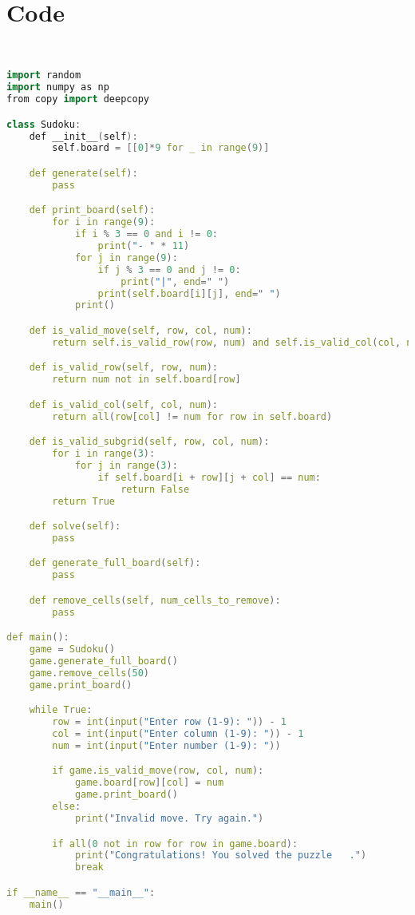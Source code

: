 \documentclass{article}
\begin{document}
\section{Code}
\begin{lstlisting}[language=C++, caption=GAE C++ Code, label=lst:code]


import random
import numpy as np
from copy import deepcopy

class Sudoku:
    def __init__(self):
        self.board = [[0]*9 for _ in range(9)]

    def generate(self):
        pass 

    def print_board(self):
        for i in range(9):
            if i % 3 == 0 and i != 0:
                print("- " * 11)
            for j in range(9):
                if j % 3 == 0 and j != 0:
                    print("|", end=" ")
                print(self.board[i][j], end=" ")
            print()

    def is_valid_move(self, row, col, num):
        return self.is_valid_row(row, num) and self.is_valid_col(col, num) and self.is_valid_subgrid(row - row % 3, col - col % 3, num)

    def is_valid_row(self, row, num):
        return num not in self.board[row]

    def is_valid_col(self, col, num):
        return all(row[col] != num for row in self.board)

    def is_valid_subgrid(self, row, col, num):
        for i in range(3):
            for j in range(3):
                if self.board[i + row][j + col] == num:
                    return False
        return True

    def solve(self):
        pass  

    def generate_full_board(self):
        pass  

    def remove_cells(self, num_cells_to_remove):
        pass  

def main():
    game = Sudoku()
    game.generate_full_board()
    game.remove_cells(50) 
    game.print_board()

    while True:
        row = int(input("Enter row (1-9): ")) - 1
        col = int(input("Enter column (1-9): ")) - 1
        num = int(input("Enter number (1-9): "))

        if game.is_valid_move(row, col, num):
            game.board[row][col] = num
            game.print_board()
        else:
            print("Invalid move. Try again.")

        if all(0 not in row for row in game.board):
            print("Congratulations! You solved the puzzle   .")
            break

if __name__ == "__main__":
    main()

\end{lstlisting}
\end{document}
